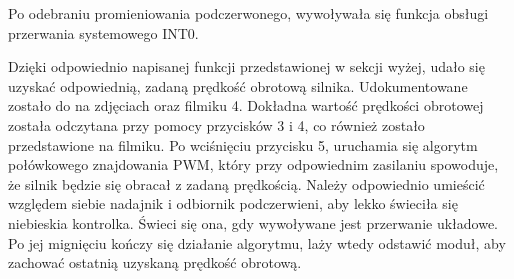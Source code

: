 \documentclass[a4paper,oneside,11pt]{report}
\begin{document}
\begin{enumerate}[1.]
Po odebraniu promieniowania podczerwonego, wywoływała się funkcja obsługi przerwania systemowego INT0.

Dzięki odpowiednio napisanej funkcji przedstawionej w sekcji wyżej, udało się uzyskać odpowiednią, zadaną prędkość obrotową silnika. Udokumentowane zostało do na zdjęciach oraz filmiku 4. Dokładna wartość prędkości obrotowej została odczytana przy pomocy przycisków 3 i 4, co również zostało przedstawione na filmiku. Po wciśnięciu przycisku 5, uruchamia się algorytm połówkowego znajdowania PWM, który przy odpowiednim zasilaniu spowoduje, że silnik będzie się obracał z zadaną prędkością. Należy odpowiednio umieścić względem siebie nadajnik i odbiornik podczerwieni, aby lekko świeciła się niebieskia kontrolka. Świeci się ona, gdy wywoływane jest przerwanie układowe. Po jej mignięciu kończy się działanie algorytmu, laży wtedy odstawić moduł, aby zachować ostatnią uzyskaną prędkość obrotową.


\end{enumerate}
\end{document}
